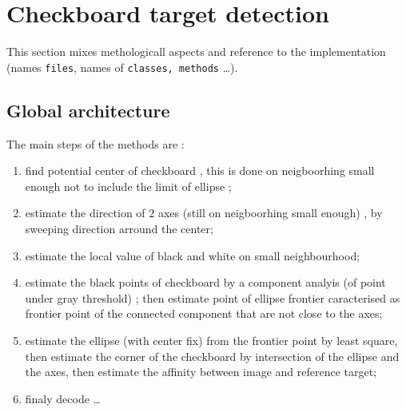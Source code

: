 

\section{Checkboard target detection}

This section mixes methologicall aspects and reference to the implementation 
(names {\tt files}, names of {\tt classes, methods} \dots).


\subsection{Global architecture}

The main steps of the methods are :

\begin{enumerate}
       \item find potential center of checkboard , this is done on neigboorhing small enough not
             to include the limit of ellipse ;

     \item estimate the direction of $2$ axes  (still on neigboorhing small enough) , by sweeping direction arround
	     the center;

     \item estimate the local value of black and white on small neighbourhood;

     \item estimate the black points of checkboard by a component analyis (of point under gray threshold) ;
           then estimate  point of ellipse frontier caracterised as frontier point of the connected component  that are not 
	   close to the axes;

     \item estimate the ellipse (with center fix) from the frontier point by least square, 
           then estimate the corner of the checkboard by intersection of the ellipse and the axes,
           then estimate the affinity between image and reference target;

      \item finaly decode \dots 
             
\end{enumerate}



